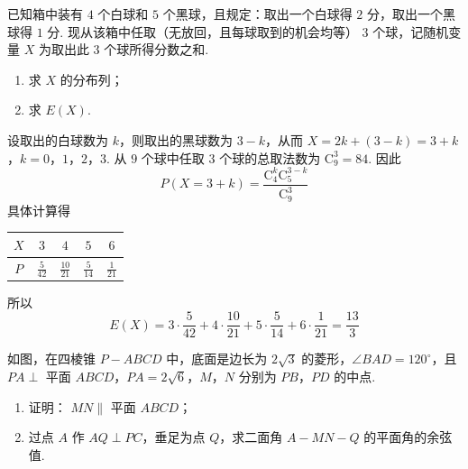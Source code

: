 \begin{problem}
已知箱中装有 \(4\) 个白球和 \(5\) 个黑球，且规定：取出一个白球得 \(2\) 分，取出一个黑球得 \(1\) 分. 现从该箱中任取（无放回，且每球取到的机会均等） \(3\) 个球，记随机变量 \(X\) 为取出此 \(3\) 个球所得分数之和.
\begin{enumerate}
\item 求 \(X\) 的分布列；
\item 求 \(E(X)\).
\end{enumerate}
\end{problem}

\begin{solution}
设取出的白球数为 \(k\)，则取出的黑球数为 \(3-k\)，从而
\(X=2k+(3-k)=3+k\)，\(k=0\)，\(1\)，\(2\)，\(3\).
从 \(9\) 个球中任取 \(3\) 个球的总取法数为
\(\mathrm C_9^3=84\). 因此
\[
P(X=3+k)=\frac{\mathrm C_4^k\mathrm C_5^{3-k}}{\mathrm C_9^3}
\]
具体计算得
\begin{center}
\begin{tabular}{c|cccc}
\(X\) & \(3\) & \(4\) & \(5\) & \(6\) \\
\hline
\(P\) & \(\frac{5}{42}\) & \(\frac{10}{21}\) & \(\frac{5}{14}\) & \(\frac{1}{21}\)
\end{tabular}
\end{center}

所以
\[
E(X)=3\cdot\frac{5}{42}+4\cdot\frac{10}{21}
+5\cdot\frac{5}{14}+6\cdot\frac{1}{21}
=\frac{13}{3}
\]
\end{solution}

\begin{problem}
如图，在四棱锥 \(P - ABCD\) 中，底面是边长为 \(2\sqrt{3}\) 的菱形，\(\angle BAD = 120^{\circ}\)，且 \(PA \perp\) 平面 \(ABCD\)，\(PA = 2\sqrt{6}\)，\(M\)，\(N\) 分别为 \(PB\)，\(PD\) 的中点.
\begin{enumerate}
\item 证明： \(MN \parallel\) 平面 \(ABCD\)；
\item 过点 \(A\) 作 \(AQ \perp PC\)，垂足为点 \(Q\)，求二面角 \(A - MN - Q\) 的平面角的余弦值.
\end{enumerate}
\end{problem}

